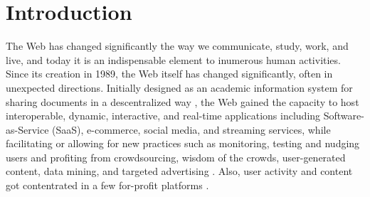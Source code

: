 \documentclass[sigconf, nonacm]{acmart}              %
\begin{document}



\maketitle

\section{Introduction}
\label{sec:intro}


The Web has changed significantly the way we communicate, study, work, and live, and today it is an indispensable element to inumerous human activities. Since its creation in 1989, the Web itself has changed significantly, often in unexpected directions. Initially designed as an academic information system for sharing documents in a descentralized way \cite{BernersLee1990}, the Web gained the capacity to host interoperable, dynamic, interactive, and real-time applications including Software-as-Service (SaaS), e-commerce, social media, and streaming services, while facilitating or allowing for new practices such as monitoring, testing and nudging users \cite{Zuboff2019} and profiting from crowdsourcing, wisdom of the crowds, user-generated content, data mining, and targeted advertising \cite{OReilly2005}. Also, user activity and content got contentrated in a few for-profit platforms \cite{Xavier2024}. 
\end{document}
